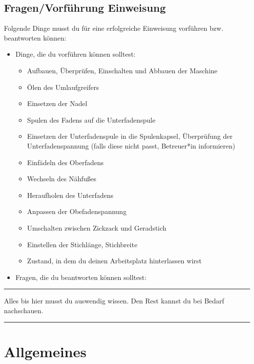\documentclass{\basedir/fablab-document}
\begin{document}
\pagebreak

\subsection{Fragen/Vorführung Einweisung}
Folgende Dinge musst du für eine erfolgreiche Einweisung vorführen bzw. beantworten können:
\begin{itemize}
	\item Dinge, die du vorführen können solltest:
	\begin{itemize}
		\item Aufbauen, Überprüfen, Einschalten und Abbauen der Maschine
		\item Ölen des Umlaufgreifers
		\item Einsetzen der Nadel
		\item Spulen des Fadens auf die Unterfadenspule
		\item Einsetzen der Unterfadenspule in die Spulenkapsel, Überprüfung der Unterfadenspannung (falls diese nicht passt, Betreuer*in informieren)
		\item Einfädeln des Oberfadens
		\item Wechseln des Nähfußes
		\item Heraufholen des Unterfadens
		\item Anpassen der Obefadenspannung
		\item Umschalten zwischen Zickzack und Geradstich
		\item Einstellen der Stichlänge, Stichbreite
		\item Zustand, in dem du deinen Arbeitsplatz hinterlassen wirst
	\end{itemize}
	
	\item Fragen, die du beantworten können solltest:
\end{itemize}



\vspace{5em}
\hrule

Alles bis hier musst du auswendig wissen. Den Rest kannst du bei Bedarf nachschauen.
\vspace{0.2em}
\hrule
\vspace{3em}

\pagebreak
\section{Allgemeines}
\end{document}
